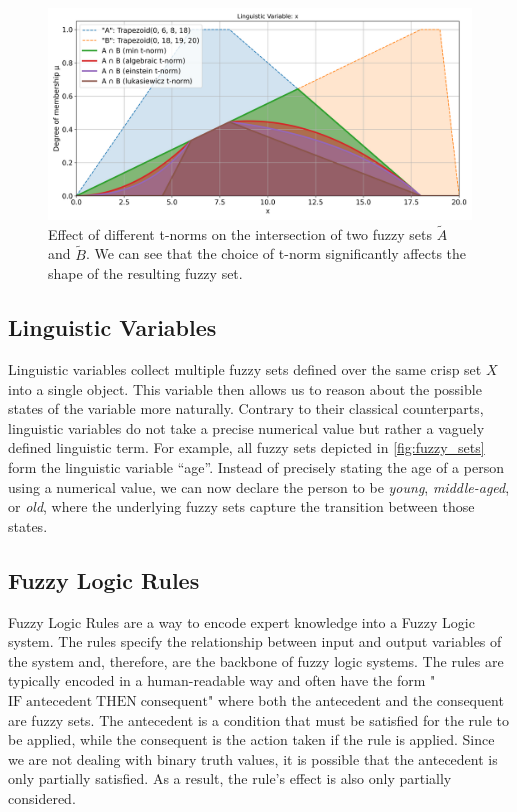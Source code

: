 \begin{figure}
      \centering
      \includegraphics[width=0.9\columnwidth,trim={0 0 0 0.85cm},clip]{figures/Intro/tnorms.png}
      \caption[Effect of different t-norms on the intersection of two fuzzy sets]{Effect of different t-norms on the intersection of two fuzzy sets $\tilde{A}$ and $\tilde{B}$. We can see that the choice of t-norm significantly affects the shape of the resulting fuzzy set.}
      \label{fig:tnorms}
\end{figure}


\subsection{Linguistic Variables}

Linguistic variables collect multiple fuzzy sets defined over the same crisp set $X$ into a single object. This variable then allows us to reason about the possible states of the variable more naturally.
Contrary to their classical counterparts, linguistic variables do not take a precise numerical value but rather a vaguely defined linguistic term.
For example, all fuzzy sets depicted in \autoref{fig:fuzzy_sets} form the linguistic variable ``age''. Instead of precisely stating the age of a person using a numerical value, we can now declare the person to be \emph{young}, \emph{middle-aged}, or \emph{old}, where the underlying fuzzy sets capture the transition between those states.


\subsection{Fuzzy Logic Rules}

Fuzzy Logic Rules are a way to encode expert knowledge into a Fuzzy Logic system. The rules specify the relationship between input and output variables of the system and, therefore, are the backbone of fuzzy logic systems.
The rules are typically encoded in a human-readable way and often have the form "$\text{IF} \; \text{antecedent} \; \text{THEN} \; \text{consequent}$" where both the antecedent and the consequent are fuzzy sets. The antecedent is a condition that must be satisfied for the rule to be applied, while the consequent is the action taken if the rule is applied. Since we are not dealing with binary truth values, it is possible that the antecedent is only partially satisfied. As a result, the rule's effect is also only partially considered.

